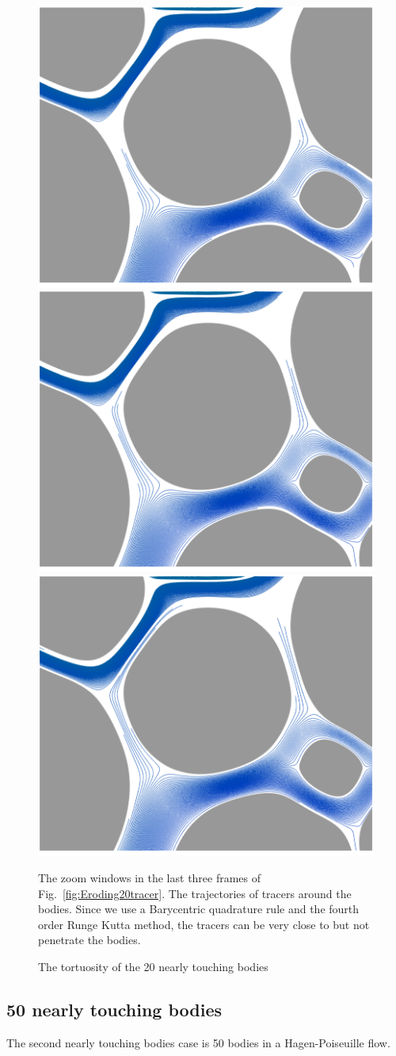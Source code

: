 \documentclass[preprint, 10pt]{elsarticle}
\begin{document}
\begin{figure}[H]
\begin{center}
\includegraphics[width = 0.3 \textwidth]{./figs/tracer_20b210_zoom}
\includegraphics[width = 0.3 \textwidth]{./figs/tracer_20b240_zoom}
\includegraphics[width = 0.3 \textwidth]{./figs/tracer_20b270_zoom}
\caption{\label{fig:Eroding20zoom}The zoom windows in the last three frames of Fig.~\ref{fig:Eroding20tracer}. The trajectories of tracers around the bodies. Since we use a Barycentric quadrature rule and the fourth order Runge Kutta method, the tracers can be very close to but not penetrate the bodies. }
\end{center}
\end{figure}


\begin{figure}[H]
\begin{center}
\caption{The tortuosity of the 20 nearly touching bodies}
\end{center}
\end{figure}

\subsection{50 nearly touching bodies}
{\color{red}
The second nearly touching bodies case is 50 bodies in a Hagen-Poiseuille flow.
}
\end{document}

